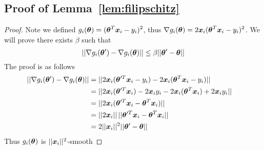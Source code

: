 \documentclass{article} %
\begin{document}
\begin{appendices}
	\subsection{Proof of Lemma~\ref{lem:filipschitz}}
	\label{app:filipschitz}
	\begin{proof}
   		Note we defined $\displaystyle g_i({\bm{\theta}})  = ({\bm{\theta}}^T{\bm{x}}_i - y_i)^2 $, thus $\displaystyle \nabla g_i({\bm{\theta}}) = 2{\bm{x}}_i({\bm{\theta}}^T{\bm{x}}_i - y_i)^2$. We will prove there exists $\beta$ such that 
   		\begin{equation}
   			\displaystyle || \nabla g_i({\bm{\theta}}') - \nabla g_i({\bm{\theta}}) || \leq \beta|| {\bm{\theta}}' - {\bm{\theta}} ||
   		\end{equation}
   	The proof is as follows
   	\begin{align}
		|| \nabla g_i({\bm{\theta}}') - \nabla g_i({\bm{\theta}}) || &= || 2{\bm{x}}_i ({\bm{\theta}}'^T{\bm{x}}_i - y_i) - 2{\bm{x}}_i ({\bm{\theta}}^T{\bm{x}}_i - y_i) || &&\\
		&= || 2{\bm{x}}_i({\bm{\theta}}'^T{\bm{x}}_i) - 2{\bm{x}}_iy_i - 2{\bm{x}}_i({\bm{\theta}}^T{\bm{x}}_i) + 2{\bm{x}}_iy_i || &&\\
		&= || 2{\bm{x}}_i({\bm{\theta}}'^T{\bm{x}}_i - {\bm{\theta}}^T{\bm{x}}_i) || &&\\
		&= || 2{\bm{x}}_i || \, || {\bm{\theta}}'^T{\bm{x}}_i - {\bm{\theta}}^T{\bm{x}}_i || &&\\		
		&= 2 || {\bm{x}}_i ||^2 || {\bm{\theta}}' - {\bm{\theta}} || &&
  	\end{align}
  Thus $g_i({\bm{\theta}})$ is $|| {\bm{x}}_i ||^2$-smooth
   	\end{proof}
  

\end{appendices}
\end{document}
